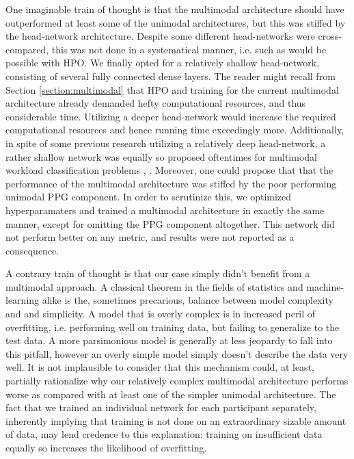 \documentclass[12pt]{article}
\begin{document}
One imaginable train of thought is that the multimodal architecture should have outperformed at least some of the unimodal architectures, but this was stiffed by the head-network architecture. Despite some different head-networks were cross-compared, this was not done in a systematical manner, i.e. such as would be possible with HPO. We finally opted for a relatively shallow head-network, consisting of several fully connected dense layers. The reader might recall from Section \ref{section:multimodal} that HPO and training for the current multimodal architecture already demanded hefty computational resources, and thus considerable time. Utilizing a deeper head-network would increase the required computational resources and hence running time exceedingly more.  Additionally, in spite of some previous research utilizing a relatively deep head-network, a rather shallow network was equally so proposed oftentimes for multimodal workload classification problems \cite{yin2017recognition}, \cite{han2020classification} \cite{rastgoo2019automatic}. Moreover, one could propose that that the performance of the multimodal architecture was stiffed by the poor performing unimodal PPG component. In order to scrutinize this, we optimized hyperparamaters and trained a multimodal architecture in exactly the same manner, except for omitting the PPG component altogether. This network did not perform better on any metric, and results were not reported as a consequence. 	

A contrary train of thought is that our case simply didn't benefit from a multimodal approach.  A classical theorem in the fields of statistics and machine-learning alike is the, sometimes precarious, balance between model complexity and and simplicity. A model that is overly complex is in increased peril of overfitting, i.e. performing well on training data, but failing to generalize to the test data.  A more parsimonious model is generally at less jeopardy to fall into this pitfall, however an overly simple model simply doesn't describe the data very well. It is not implausible to consider that this mechanism could, at least, partially rationalize why our relatively complex multimodal architecture performs worse as compared with at least one of the simpler unimodal architecture. The fact that we trained an individual network for each participant separately, inherently implying that training is not done on an extraordinary sizable amount of data, may lend credence to this explanation: training on insufficient data equally so increases the likelihood of overfitting. 
\end{document}
